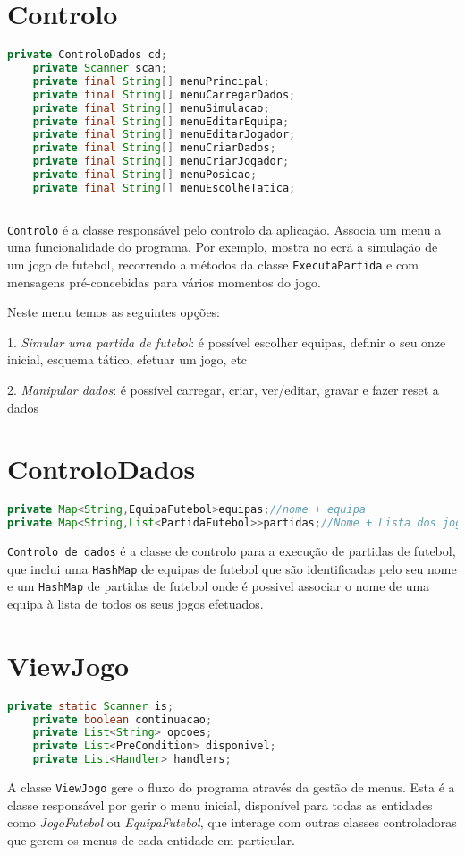 \documentclass[a4paper]{report}
\begin{document}
	\section{Controlo}
	\begin{lstlisting}[language=Java]
    private ControloDados cd;
    private Scanner scan;
    private final String[] menuPrincipal;
    private final String[] menuCarregarDados;
    private final String[] menuSimulacao;
    private final String[] menuEditarEquipa;
    private final String[] menuEditarJogador;
    private final String[] menuCriarDados;
    private final String[] menuCriarJogador;
    private final String[] menuPosicao;
    private final String[] menuEscolheTatica;
    
	\end{lstlisting}
	\texttt{Controlo} é a classe responsável pelo controlo da aplicação. Associa um menu a uma funcionalidade do programa. Por exemplo, mostra no ecrã a simulação de um jogo de futebol, recorrendo a métodos da classe \texttt{ExecutaPartida} e com mensagens pré-concebidas para vários momentos do jogo. 
	
	 Neste menu temos as seguintes opções: \par
	 \vspace{0.05cm}
1. \textit{Simular uma partida de futebol}: é possível escolher equipas, definir o seu onze inicial, esquema tático, efetuar um jogo, etc \par
2. \textit{Manipular dados}: é possível carregar, criar, ver/editar, gravar e fazer reset a dados

      
	
	\section{ControloDados}
	\begin{lstlisting}[language=Java]
private Map<String,EquipaFutebol>equipas;//nome + equipa
private Map<String,List<PartidaFutebol>>partidas;//Nome + Lista dos jogos 
	\end{lstlisting}
	
\texttt{Controlo de dados} é a classe de controlo para a execução de partidas de futebol, que inclui uma \texttt{HashMap} de equipas de futebol que são identificadas pelo seu nome e um \texttt{HashMap} de partidas de futebol onde é possivel associar o nome de uma equipa à lista de todos os seus jogos efetuados.
 
	
	\section{ViewJogo}
	\begin{lstlisting}[language=Java]
    private static Scanner is;
    private boolean continuacao;
    private List<String> opcoes;        
    private List<PreCondition> disponivel; 
    private List<Handler> handlers;     
	\end{lstlisting}
	A classe \texttt{ViewJogo} gere o fluxo do programa através da gestão de menus. Esta é a classe responsável por gerir o menu inicial, disponível para todas as entidades como \textit{JogoFutebol} ou \textit{EquipaFutebol}, que interage com outras classes controladoras que gerem os menus de cada entidade em particular.
\end{document}
